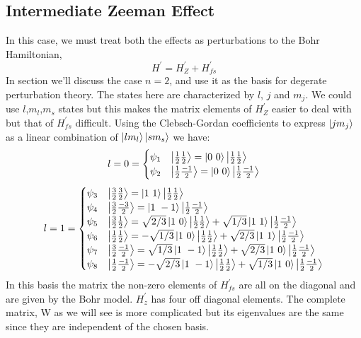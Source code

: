 \subsection{Intermediate Zeeman Effect}
In this case, we must treat both the effects as perturbations to the Bohr Hamiltonian,
\begin{equation}
H^{'} = H^{'}_{Z} + H^{'}_{fs}
\end{equation}
In section we'll discuss the case $n = 2$, and use it as the basis for degerate perturbation theory. The states here are characterized by $l$, $j$ and $m_{j}$. We could use $l$,$m_{l}$,$m_{s}$ states but this makes the matrix elements of $H^{'}_{Z}$ easier to deal with but that of $H^{'}_{fs}$ difficult. Using the Clebsch-Gordan coefficients to express $\ket{j m_{j}}$ as a linear combination of $\ket{l m_{l}} \ket{s m_{s}}$ we have:
$$l = 0 = \begin{cases}
\psi_{1} & \ket{\frac{1}{2} \frac{1}{2}} = \ket{0 \ 0}\ket{\frac{1}{2}\frac{1}{2}}\\
\psi_{2} & \ket{\frac{1}{2} \frac{-1}{2}} = \ket{0 \ 0}\ket{\frac{1}{2}\frac{-1}{2}}
\end{cases} $$
$$l = 1 = \begin{cases}
\psi_{3} & \ket{\frac{3}{2} \frac{3}{2}} = \ket{1 \ 1}\ket{\frac{1}{2}\frac{1}{2}}\\
\psi_{4} & \ket{\frac{3}{2} \frac{-3}{2}} = \ket{1 \ -1}\ket{\frac{1}{2}\frac{-1}{2}}\\
\psi_{5} & \ket{\frac{3}{2} \frac{1}{2}} = \sqrt{2/3}\ket{1 \ 0}\ket{\frac{1}{2}\frac{1}{2}} + \sqrt{1/3}\ket{1 \ 1}\ket{\frac{1}{2}\frac{-1}{2}}\\
\psi_{6} & \ket{\frac{1}{2} \frac{1}{2}} = -\sqrt{1/3}\ket{1 \ 0}\ket{\frac{1}{2}\frac{1}{2}} + \sqrt{2/3}\ket{1 \ 1}\ket{\frac{1}{2}\frac{-1}{2}}\\
\psi_{7} & \ket{\frac{3}{2} \frac{-1}{2}} = \sqrt{1/3}\ket{1 \ -1}\ket{\frac{1}{2}\frac{1}{2}} + \sqrt{2/3}\ket{1 \ 0}\ket{\frac{1}{2}\frac{-1}{2}}\\
\psi_{8} & \ket{\frac{1}{2} \frac{-1}{2}} = -\sqrt{2/3}\ket{1 \ -1}\ket{\frac{1}{2}\frac{1}{2}} + \sqrt{1/3}\ket{1 \ 0}\ket{\frac{1}{2}\frac{-1}{2}}\\
\end{cases} $$
In this basis the matrix the non-zero elements of $H^{'}_{fs}$ are all on the diagonal and are given by the Bohr model. $H^{'}_{z}$ has four off diagonal elements. The complete matrix, W as we will see is more complicated but its eigenvalues are the same since they are independent of the chosen basis.
